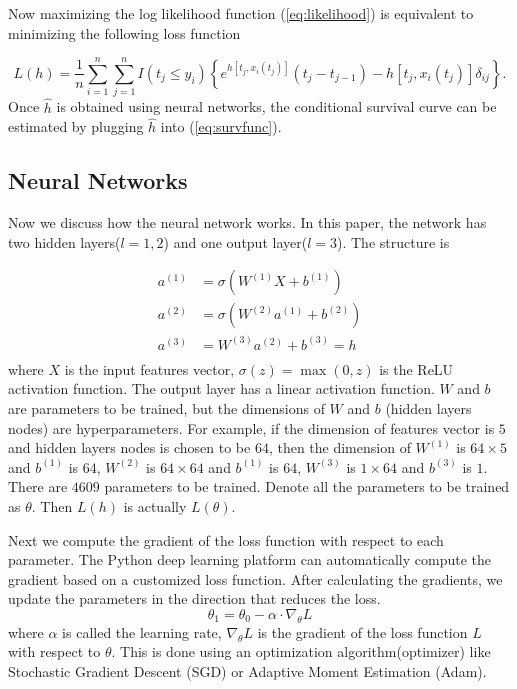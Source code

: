 \documentclass[12pt]{article}
\begin{document}
Now maximizing the log likelihood function (\ref{eq:likelihood}) is
equivalent to minimizing the following loss function

$$L(h)=\frac{1}{n} \sum_{i=1}^n \sum_{j=1}^n I\left(t_j \leq y_i\right)\left\{e^{h\left[t_j, x_i\left(t_j\right)\right]}\left(t_j-t_{j-1}\right)-h\left[t_j, x_i\left(t_j\right)\right] \delta_{i j}\right\}.$$
Once $\hat{h}$ is obtained using neural networks, the conditional
survival curve can be estimated by plugging $\hat{h}$ into
(\ref{eq:survfunc}).

\subsection{Neural Networks}

Now we discuss how the neural network works. In this paper, the
network has two hidden layers($l=1,2$) and one output
layer($l=3$). The structure is

\begin{align*} a^{(1)} &= \sigma(W^{(1)} X + b^{(1)}) \\ a^{(2)} &=
\sigma(W^{(2)} a^{(1)} + b^{(2)}) \\ a^{(3)} &= W^{(3)} a^{(2)} +
b^{(3)} = h \\
\end{align*} where $X$ is the input features vector,
$\sigma(z)=\max(0,z)$ is the ReLU activation function. The output
layer has a linear activation function.  $W$ and $b$ are parameters to
be trained, but the dimensions of $W$ and $b$ (hidden layers nodes)
are hyperparameters. For example, if the dimension of features vector
is $5$ and hidden layers nodes is chosen to be $64$, then the
dimension of $W^{(1)}$ is $64 \times 5$ and $b^{(1)}$ is $64$,
$W^{(2)}$ is $64 \times 64$ and $b^{(1)}$ is $64$, $W^{(3)}$ is $1
\times 64$ and $b^{(3)}$ is $1$. There are $4609$ parameters to be
trained. Denote all the parameters to be trained as $\theta$. Then
$L(h)$ is actually $L(\theta)$.

Next we compute the gradient of the loss function with respect to each
parameter. The Python deep learning platform can automatically compute
the gradient based on a customized loss function. After calculating
the gradients, we update the parameters in the direction that reduces
the loss.
$$\theta_{1} = \theta_{0} - \alpha \cdot \nabla_\theta L$$
where $\alpha$ is called the learning rate, $\nabla_\theta L$ is the
gradient of the loss function $L$ with respect to $\theta$. This is
done using an optimization algorithm(optimizer) like Stochastic
Gradient Descent (SGD) or Adaptive Moment Estimation (Adam).
\end{document}
